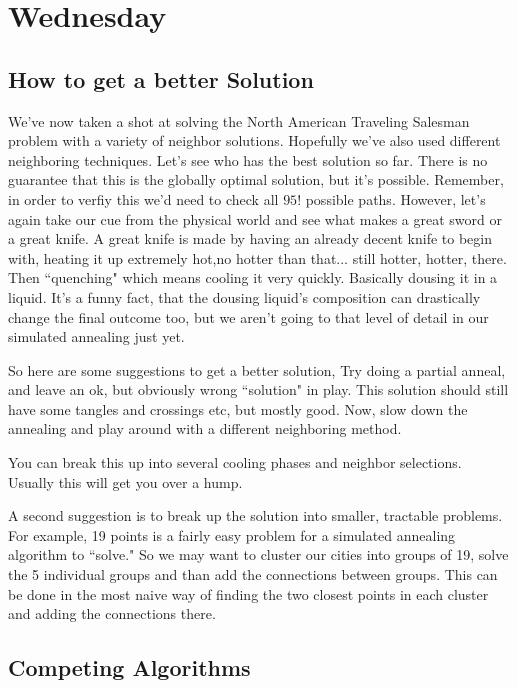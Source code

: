 \documentclass{article}
\theoremstyle{definition}
\theoremstyle{remark}
\begin{document}
\section{Wednesday}
\subsection{How to get a better Solution}

We've now taken a shot at solving the North American Traveling Salesman problem with a variety of neighbor solutions. Hopefully we've also used different neighboring techniques.  Let's see who has the best solution so far.
There is no guarantee that this is the globally optimal solution, but it's possible.  Remember, in order to verfiy this we'd need to check all $95!$ possible paths.  However, let's again take our cue from the physical world and see what makes a great sword or a great knife.  A great knife is made by having an already decent knife to begin with, heating it up extremely hot,no hotter than that... still hotter, hotter, there.  Then ``quenching" which means cooling it very quickly.  Basically dousing it in a liquid.  It's a funny fact, that the dousing liquid's composition can drastically change the final outcome too, but we aren't going to that level of detail in our simulated annealing just yet.

So here are some suggestions to get a better solution, Try doing a partial anneal, and leave an ok, but obviously wrong ``solution" in play. This solution should still have some tangles and crossings etc, but mostly good.  Now, slow down the annealing and play around with a different neighboring method.

You can break this up into several cooling phases and neighbor selections.  Usually this will get you over a hump.

A second suggestion is to break up the solution into smaller, tractable problems.  For example, 19 points is a fairly easy problem for a simulated annealing algorithm to ``solve."  So we may want to cluster our cities into groups of 19, solve the 5 individual groups and than add the connections between groups.  This can be done in the most naive way of finding the two closest points in each cluster and adding the connections there.

\subsection{Competing Algorithms}
\end{document}
